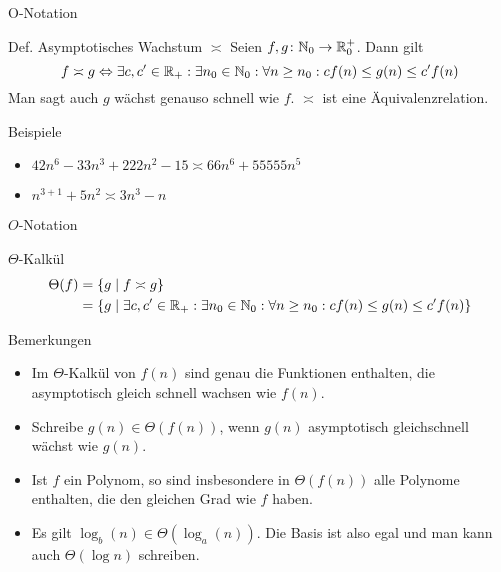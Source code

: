 \begin{frame}{O-Notation}
	\begin{block}{Def. Asymptotisches Wachstum $\asymp$}
		Seien $f,g \colon \mathbb{N}_0 \to \mathbb{R}^+_0$. Dann gilt
		\[
			f \asymp g \Leftrightarrow \exists c,c'\in \mathbb{R}_+: \exists n_0\in \mathbb{N}_0: \forall n\geq n_0: c f(n) \leq g(n) \leq c' f(n)
		\]
		Man sagt auch $g$ wächst genauso schnell wie $f$. $\asymp$ ist eine Äquivalenzrelation.
	\end{block}

	\begin{exampleblock}{Beispiele}
		\begin{itemize}
			\item $42n^6-33n^3+222n^2 -15 \asymp 66n^6+55555n^5$
			\item $n^{3+1}+5n^2\asymp 3n^3-n$
		\end{itemize}
	\end{exampleblock}
\end{frame}

\begin{frame}{$O$-Notation}
    \begin{block}{$\Theta$-Kalkül}
    	\begin{align*}
  			\Theta(f) &= \{ g \mid f \asymp g \} \\
  				   &= \{ g \mid \exists c,c'\in \mathbb{R}_+: \exists n_0\in \mathbb{N}_0: \forall  n\geq n_0: c f(n) \leq g(n) \leq c' f(n) \} 
		\end{align*}
    \end{block}

    \begin{exampleblock}{Bemerkungen}
    	\begin{itemize}
    		\item Im $\Theta$-Kalkül von $f(n)$ sind genau die Funktionen enthalten, die asymptotisch gleich schnell wachsen wie $f(n)$.
    		\item Schreibe $g(n) \in \Theta(f(n))$, wenn $g(n)$ asymptotisch gleichschnell wächst wie $g(n)$.
    		\item Ist $f$ ein Polynom, so sind insbesondere in $\Theta(f(n))$ alle Polynome enthalten, die den gleichen Grad wie $f$ haben.
    		\item Es gilt $\log_b(n) \in\Theta(\log_a(n))$. Die Basis ist also egal und man kann auch $\Theta(\log n)$ schreiben. %
    	\end{itemize}
    \end{exampleblock}
\end{frame}


